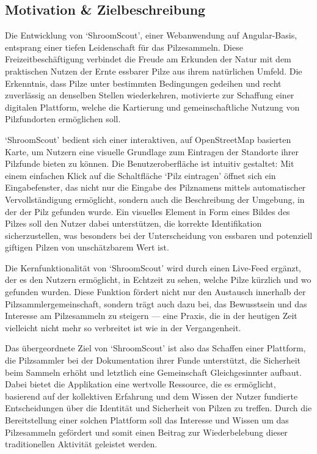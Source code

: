 \documentclass[../main.tex]{subfiles}
\begin{document}
\subsection{Motivation \& Zielbeschreibung}

Die Entwicklung von `ShroomScout', einer Webanwendung auf Angular-Basis, entsprang einer tiefen Leidenschaft
für das Pilzesammeln. Diese Freizeitbeschäftigung verbindet die Freude am Erkunden der Natur mit dem praktischen
Nutzen der Ernte essbarer Pilze aus ihrem natürlichen Umfeld. Die Erkenntnis, dass Pilze unter bestimmten Bedingungen
gedeihen und recht zuverlässig an denselben Stellen wiederkehren, motivierte zur Schaffung einer digitalen Plattform,
welche die Kartierung und gemeinschaftliche Nutzung von Pilzfundorten ermöglichen soll.

`ShroomScout' bedient sich einer interaktiven, auf OpenStreetMap basierten Karte, um Nutzern eine visuelle
Grundlage zum Eintragen der Standorte ihrer Pilzfunde bieten zu können. Die Benutzeroberfläche ist intuitiv gestaltet:
Mit einem einfachen Klick auf die Schaltfläche `Pilz eintragen' öffnet sich ein Eingabefenster, das nicht nur die
Eingabe des Pilznamens mittels automatischer Vervollständigung ermöglicht, sondern auch die Beschreibung der Umgebung,
in der der Pilz gefunden wurde. Ein visuelles Element in Form eines Bildes des Pilzes soll den Nutzer dabei unterstützen,
die korrekte Identifikation sicherzustellen, was besonders bei der Unterscheidung von essbaren und potenziell giftigen
Pilzen von unschätzbarem Wert ist.

Die Kernfunktionalität von `ShroomScout' wird durch einen Live-Feed ergänzt, der es den Nutzern ermöglicht,
in Echtzeit zu sehen, welche Pilze kürzlich und wo gefunden wurden. Diese Funktion fördert nicht nur den
Austausch innerhalb der Pilzsammlergemeinschaft, sondern trägt auch dazu bei, das Bewusstsein und das
Interesse am Pilzesammeln zu steigern --- eine Praxis, die in der heutigen Zeit vielleicht nicht mehr so
verbreitet ist wie in der Vergangenheit.

Das übergeordnete Ziel von `ShroomScout' ist also das Schaffen einer Plattform, die Pilzsammler bei der Dokumentation
ihrer Funde unterstützt, die Sicherheit beim Sammeln erhöht und letztlich eine Gemeinschaft Gleichgesinnter
aufbaut. Dabei bietet die Applikation eine wertvolle Ressource, die es ermöglicht, basierend auf der kollektiven Erfahrung
und dem Wissen der Nutzer fundierte Entscheidungen über die Identität und Sicherheit von Pilzen zu treffen. Durch die
Bereitstellung einer solchen Plattform soll das Interesse und Wissen um das Pilzesammeln gefördert und somit einen Beitrag
zur Wiederbelebung dieser traditionellen Aktivität geleistet werden.
\end{document}
